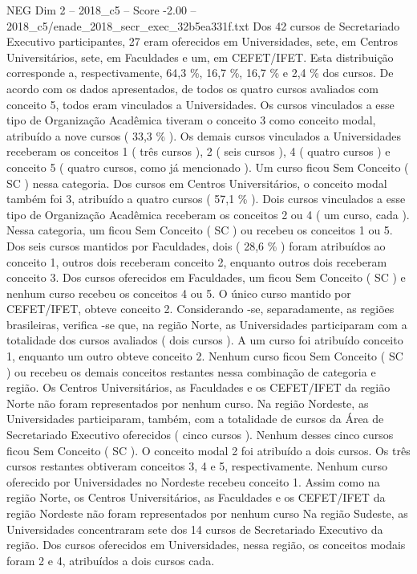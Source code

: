 \begin{textsample}{NEG Dim 2 – 2018\_c5 – Score -2.00 – 2018\_c5/enade\_2018\_secr\_exec\_32b5ea331f.txt}
Dos 42 cursos de Secretariado Executivo participantes, 27 eram oferecidos em Universidades, sete, em Centros Universitários, sete, em Faculdades e um, em CEFET/IFET.
Esta distribuição corresponde a, respectivamente, 64,3 \%, 16,7 \%, 16,7 \% e 2,4 \% dos cursos.
De acordo com os dados apresentados, de todos os quatro cursos avaliados com conceito 5, todos eram vinculados a Universidades.
Os cursos vinculados a esse tipo de Organização Acadêmica tiveram o conceito 3 como conceito modal, atribuído a nove cursos ( 33,3 \% ).
Os demais cursos vinculados a Universidades receberam os conceitos 1 ( três cursos ), 2 ( seis cursos ), 4 ( quatro cursos ) e conceito 5 ( quatro cursos, como já mencionado ).
Um curso ficou Sem Conceito ( SC ) nessa categoria.
Dos cursos em Centros Universitários, o conceito modal também foi 3, atribuído a quatro cursos ( 57,1 \% ).
Dois cursos vinculados a esse tipo de Organização Acadêmica receberam os conceitos 2 ou 4 ( um curso, cada ).
Nessa categoria, um ficou Sem Conceito ( SC ) ou recebeu os conceitos 1 ou 5.
Dos seis cursos mantidos por Faculdades, dois ( 28,6 \% ) foram atribuídos ao conceito 1, outros dois receberam conceito 2, enquanto outros dois receberam conceito 3.
Dos cursos oferecidos em Faculdades, um ficou Sem Conceito ( SC ) e nenhum curso recebeu os conceitos 4 ou 5.
O único curso mantido por CEFET/IFET, obteve conceito 2.
Considerando -se, separadamente, as regiões brasileiras, verifica -se que, na região Norte, as Universidades participaram com a totalidade dos cursos avaliados ( dois cursos ).
A um curso foi atribuído conceito 1, enquanto um outro obteve conceito 2.
Nenhum curso ficou Sem Conceito ( SC ) ou recebeu os demais conceitos restantes nessa combinação de categoria e região.
Os Centros Universitários, as Faculdades e os CEFET/IFET da região Norte não foram representados por nenhum curso.
Na região Nordeste, as Universidades participaram, também, com a totalidade de cursos da Área de Secretariado Executivo oferecidos ( cinco cursos ).
Nenhum desses cinco cursos ficou Sem Conceito ( SC ).
O conceito modal 2 foi atribuído a dois cursos.
Os três cursos restantes obtiveram conceitos 3, 4 e 5, respectivamente.
Nenhum curso oferecido por Universidades no Nordeste recebeu conceito 1.
Assim como na região Norte, os Centros Universitários, as Faculdades e os CEFET/IFET da região Nordeste não foram representados por nenhum curso Na região Sudeste, as Universidades concentraram sete dos 14 cursos de Secretariado Executivo da região.
Dos cursos oferecidos em Universidades, nessa região, os conceitos modais foram 2 e 4, atribuídos a dois cursos cada.

\end{textsample}
